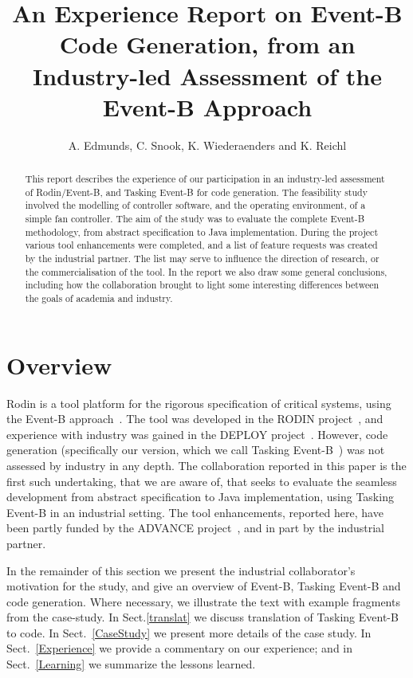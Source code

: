 \documentclass{llncs}%
\begin{document}
%
\title{An Experience Report on Event-B Code Generation, from an Industry-led Assessment of the Event-B Approach }
\author{A. Edmunds, C. Snook, K. Wiederaenders and K. Reichl}



\maketitle
%
\begin{abstract}
This report describes the experience of our participation in an industry-led assessment of Rodin/Event-B, and Tasking Event-B for code generation. The feasibility study involved the modelling of controller software, and the operating environment, of a simple fan controller. The aim of the study was to evaluate the complete Event-B methodology, from abstract specification to Java implementation. During the project various tool enhancements were completed, and a list of feature requests was created by the industrial partner. The list may serve to influence the direction of research, or the commercialisation of the tool. In the report we also draw some general conclusions, including how the collaboration brought to light some interesting differences between the goals of academia and industry. 
 \end{abstract}
%
%
\section{Overview}
Rodin is a  tool platform for the rigorous specification of critical systems, using the Event-B approach~\cite{ABR10}. The tool was developed in the RODIN project~\cite{RodinTool}, and experience with industry was gained in the DEPLOY project~\cite{DEPLOY}. However, code generation (specifically our version, which we call Tasking Event-B~\cite{ae2011a}) was not assessed by industry in any depth. The collaboration reported in this paper is the first such undertaking, that we are aware of, that seeks to evaluate the seamless development from abstract specification to Java implementation, using Tasking Event-B in an industrial setting. The tool enhancements, reported here, have been partly funded by the ADVANCE project~\cite{advance}, and in part by the industrial partner.

In the remainder of this section we present the industrial collaborator's motivation for the study, and give an overview of Event-B, Tasking Event-B and code generation. Where necessary, we illustrate the text with example fragments from the case-study. In Sect.\ref{translat} we discuss translation of Tasking Event-B to code. In Sect.~\ref{CaseStudy} we present more details of the case study. In Sect.~\ref{Experience} we provide a commentary on our experience; and in Sect.~\ref{Learning} we summarize the lessons learned.
%
\end{document}
